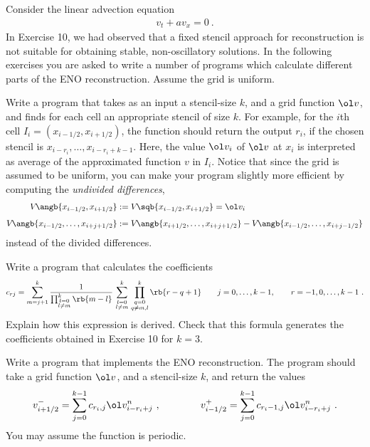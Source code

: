 \documentclass{article}
\begin{document}



Consider the linear advection equation
\begin{gather} \label{linadv}
	v_t + a v_x = 0\ .
\end{gather}%
In Exercise 10, we had observed that a fixed stencil approach for reconstruction is not suitable for obtaining stable, non-oscillatory solutions. In the following exercises you are asked to write a number of programs which calculate different parts of the ENO reconstruction. Assume the grid is uniform.


\begin{exerciseList}


\item
Write a program that takes as an input a stencil-size $k$, and a grid function $\ol v$, and finds for each cell an appropriate stencil of size $k$. For example, for the $i$th cell $I_i=(x_{i-1/2},  x_{i+1/2})$, the function should return the output $r_i$, if the chosen stencil is $x_{i-r_i},\ldots,x_{i-r_i+k-1}$. Here, the value $\ol v_i$ of $\ol v$ at $x_i$ is interpreted as average of the approximated function $v$ in $I_i$. Notice that since the grid is assumed to be uniform, you can make your program slightly more efficient by computing the {\it undivided differences},
\begin{align}
	V\!\angb{x_{i-1/2},x_{i+1/2}}& :=V\!\sqb{x_{i-1/2},x_{i+1/2}} =\ol v_i\\[0.5em]
	V\!\angb{x_{i-1/2},\ldots,x_{i+j+1/2}} &:=
		V\!\angb{x_{i+1/2},\ldots,x_{i+j+1/2}}
		-V\!\angb{x_{i-1/2},\ldots,x_{i+j-1/2}}
\end{align}
instead of the divided differences.


\item
Write a program that calculates the coefficients
\begin{gather}%
	c_{rj}=\sum_{m=j+1}^k
		\frac{1}{\prod_{\substack{l=0 \\l\ne m}}^k\rb{m-l}}\,
			\sum_{\substack{l=0\\l\ne m}}^k\,
			\prod_{\substack{q=0\\q\ne m,l}}^k\rb{r-q+1}
		\qquad
		j=0,\ldots,k-1, \qquad r=-1,0,\ldots,k-1\ .
\end{gather}%
Explain how this expression is derived. Check that this formula generates the coefficients obtained in Exercise 10 for $k=3$.


\item
Write a program that implements the ENO reconstruction. The program should take a grid function $\ol v$, and a stencil-size $k$, and return the values
\begin{gather}%
	v_{i+1/2}^-=\sum_{j=0}^{k-1} c_{r_i,j} \ol v_{i-r_i+j}^n\ ,
	\qquad\qquad
	v_{i-1/2}^+=\sum_{j=0}^{k-1} c_{r_i-1,j}\ol v_{i-r_i+j}^n\ .
\end{gather}%
You may assume the function is periodic.


\end{exerciseList}
\end{document}
